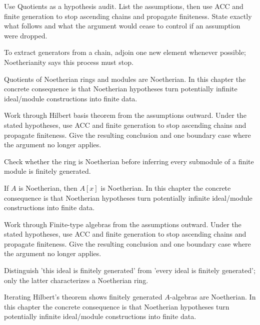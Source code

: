 \begin{exercise}\label{exr:v15-06}
Use Quotients as a hypothesis audit. List the assumptions, then use ACC and finite generation to stop ascending chains and propagate finiteness. State exactly what follows and what the argument would cease to control if an assumption were dropped.
\end{exercise}
\begin{hint}
To extract generators from a chain, adjoin one new element whenever possible; Noetherianity says this process must stop.
\end{hint}
\begin{solution}
Quotients of Noetherian rings and modules are Noetherian. In this chapter the concrete consequence is that Noetherian hypotheses turn potentially infinite ideal/module constructions into finite data.
\end{solution}

\begin{exercise}\label{exr:v15-07}
Work through Hilbert basis theorem from the assumptions outward. Under the stated hypotheses, use ACC and finite generation to stop ascending chains and propagate finiteness. Give the resulting conclusion and one boundary case where the argument no longer applies.
\end{exercise}
\begin{hint}
Check whether the ring is Noetherian before inferring every submodule of a finite module is finitely generated.
\end{hint}
\begin{solution}
If $A$ is Noetherian, then $A[x]$ is Noetherian. In this chapter the concrete consequence is that Noetherian hypotheses turn potentially infinite ideal/module constructions into finite data.
\end{solution}

\begin{exercise}\label{exr:v15-08}
Work through Finite-type algebras from the assumptions outward. Under the stated hypotheses, use ACC and finite generation to stop ascending chains and propagate finiteness. Give the resulting conclusion and one boundary case where the argument no longer applies.
\end{exercise}
\begin{hint}
Distinguish 'this ideal is finitely generated' from 'every ideal is finitely generated'; only the latter characterizes a Noetherian ring.
\end{hint}
\begin{solution}
Iterating Hilbert's theorem shows finitely generated $A$-algebras are Noetherian. In this chapter the concrete consequence is that Noetherian hypotheses turn potentially infinite ideal/module constructions into finite data.
\end{solution}

